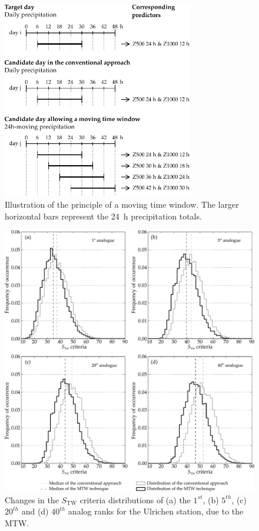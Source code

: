 \documentclass[hess, manuscript]{copernicus}
\begin{document}
\begin{figure}[htb]
	\begin{center}
		\includegraphics[width=8.3cm]{figures/illustration_moving_window.pdf}
	\end{center}
	\caption{Illustration of the principle of a moving time window. The larger horizontal bars represent the 24~h precipitation totals.}
	\label{fig:principle}
\end{figure}

\begin{figure}[htb]
	\begin{center}
		\includegraphics[width=15cm]{figures/changes_S1_analogues.pdf}
	\end{center}
	\caption{Changes in the $S_{\text{TW}}$ criteria distributions of (a) the $1^{st}$, (b) $5^{th}$, (c) $20^{th}$ and (d) $40^{th}$ analog ranks for the Ulrichen station, due to the MTW.}
	\label{fig:changes_S1_analogs}
\end{figure}
\end{document}
